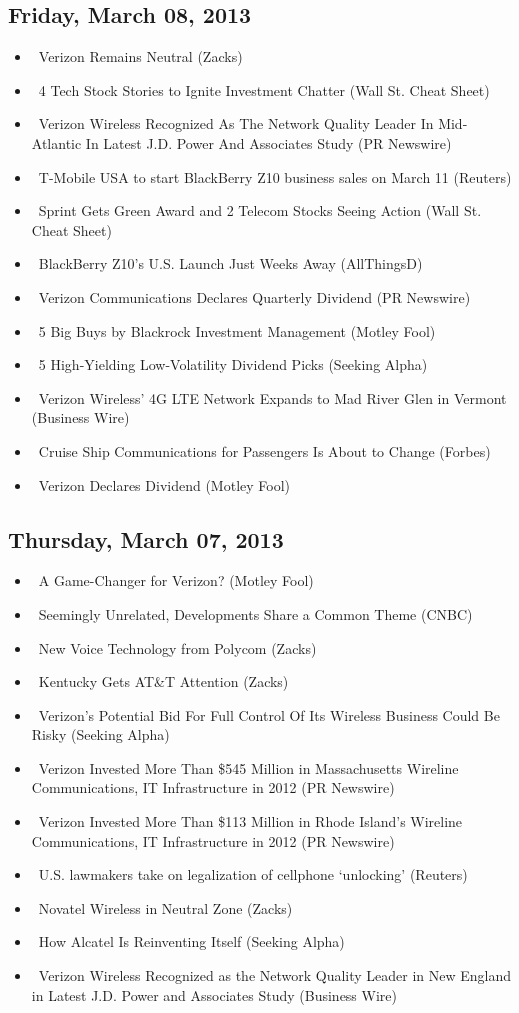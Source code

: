 \documentclass[11pt,asymmetric]{article}
\begin{document}
\subsection*{Friday, March 08, 2013}
\begin{itemize}
\item\ Verizon Remains Neutral (Zacks)
\item\ 4 Tech Stock Stories to Ignite Investment Chatter (Wall St. Cheat Sheet)
\item\ Verizon Wireless Recognized As The Network Quality Leader In Mid-Atlantic In Latest J.D. Power And Associates Study (PR Newswire)
\item\ T-Mobile USA to start BlackBerry Z10 business sales on March 11 (Reuters)
\item\ Sprint Gets Green Award and 2 Telecom Stocks Seeing Action (Wall St. Cheat Sheet)
\item\ BlackBerry Z10's U.S. Launch Just Weeks Away (AllThingsD)
\item\ Verizon Communications Declares Quarterly Dividend (PR Newswire)
\item\ 5 Big Buys by Blackrock Investment Management (Motley Fool)
\item\ 5 High-Yielding Low-Volatility Dividend Picks (Seeking Alpha)
\item\ Verizon Wireless’ 4G LTE Network Expands to Mad River Glen in Vermont (Business Wire)
\item\ Cruise Ship Communications for Passengers Is About to Change (Forbes)
\item\ Verizon Declares Dividend (Motley Fool)
\end{itemize}
\subsection*{Thursday, March 07, 2013}
\begin{itemize}
\item\ A Game-Changer for Verizon? (Motley Fool)
\item\ Seemingly Unrelated, Developments Share a Common Theme (CNBC)
\item\ New Voice Technology from Polycom (Zacks)
\item\ Kentucky Gets AT\&T Attention (Zacks)
\item\ Verizon's Potential Bid For Full Control Of Its Wireless Business Could Be Risky (Seeking Alpha)
\item\ Verizon Invested More Than \$545 Million in Massachusetts Wireline Communications, IT Infrastructure in 2012 (PR Newswire)
\item\ Verizon Invested More Than \$113 Million in Rhode Island's Wireline Communications, IT Infrastructure in 2012 (PR Newswire)
\item\ U.S. lawmakers take on legalization of cellphone `unlocking' (Reuters)
\item\ Novatel Wireless in Neutral Zone (Zacks)
\item\ How Alcatel Is Reinventing Itself (Seeking Alpha)
\item\ Verizon Wireless Recognized as the Network Quality Leader in New England in Latest J.D. Power and Associates Study (Business Wire)
\end{itemize}
\end{document}
